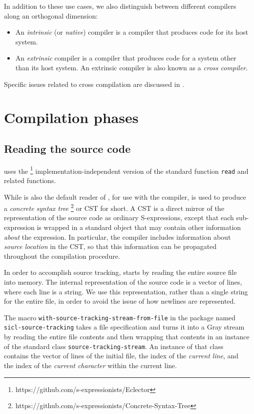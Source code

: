 In addition to these use cases, we also distinguish between different
compilers along an orthogonal dimension:

\begin{itemize}
\item An \emph{intrinsic} (or \emph{native}) compiler is a compiler
  that produces code for its host \commonlisp{} system.
\item An \emph{extrinsic} compiler is a compiler that produces code
  for a \commonlisp{} system other than its host system.  An extrinsic
  compiler is also known as a \emph{cross compiler}.
\end{itemize}

Specific issues related to cross compilation are discussed in
.

\section{Compilation phases}

\subsection{Reading the source code}

\sysname{} uses the \eclector{}%
\footnote{https://github.com/s-expressionists/Eclector}
implementation-independent version of the standard function
\texttt{read} and related functions.

While \eclector{} is also the default reader of \sysname{}, for use
with the compiler, \eclector{} is used to produce a \emph{concrete
  syntax tree}%
\footnote{https://github.com/s-expressionists/Concrete-Syntax-Tree} or
CST for short.  A CST is a direct mirror of the representation of the
source code as ordinary S-expressions, except that each sub-expression
is wrapped in a standard object that may contain other information
\emph{about} the expression.  In particular, the \sysname{} compiler
includes information about \emph{source location} in the CST, so that
this information can be propagated throughout the compilation
procedure.

In order to accomplish source tracking, \sysname{} starts by reading
the entire source file into memory.  The internal representation of
the source code is a vector of lines, where each line is a string.  We
use this representation, rather than a single string for the entire
file, in order to avoid the issue of how newlines are represented.

The macro \texttt{with-source-tracking-stream-from-file} in the
package named \texttt{sicl-source-tracking} takes a file
specification and turns it into a Gray stream by reading the entire
file contents and then wrapping that contents in an instance of the
standard class \texttt{source-tracking-stream}.  An instance of that
class contains the vector of lines of the initial file, the index of the
\emph{current line}, and the index of the \emph{current character}
within the current line.

